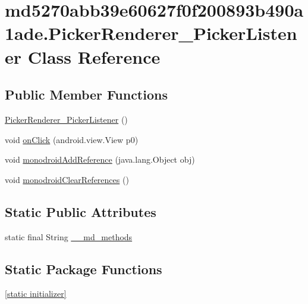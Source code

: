 \hypertarget{classmd5270abb39e60627f0f200893b490a1ade_1_1_picker_renderer___picker_listener}{
\section{md5270abb39e60627f0f200893b490a1ade.PickerRenderer\_\-PickerListener Class Reference}
\label{classmd5270abb39e60627f0f200893b490a1ade_1_1_picker_renderer___picker_listener}
}
\subsection*{Public Member Functions}
\begin{CompactItemize}
\item 
\hyperlink{classmd5270abb39e60627f0f200893b490a1ade_1_1_picker_renderer___picker_listener_ef8c4524350f9ce4bd6e7b6e89fad1b3}{PickerRenderer\_\-PickerListener} ()
\item 
void \hyperlink{classmd5270abb39e60627f0f200893b490a1ade_1_1_picker_renderer___picker_listener_1a8816a4e33f89323152ddf1198f9650}{onClick} (android.view.View p0)
\item 
void \hyperlink{classmd5270abb39e60627f0f200893b490a1ade_1_1_picker_renderer___picker_listener_b0a8d648c8fcadf63fe47a153231ea10}{monodroidAddReference} (java.lang.Object obj)
\item 
void \hyperlink{classmd5270abb39e60627f0f200893b490a1ade_1_1_picker_renderer___picker_listener_559d127bb4a4b85e43b4ab8970679f09}{monodroidClearReferences} ()
\end{CompactItemize}
\subsection*{Static Public Attributes}
\begin{CompactItemize}
\item 
static final String \hyperlink{classmd5270abb39e60627f0f200893b490a1ade_1_1_picker_renderer___picker_listener_0364241ced938474af94b5858f99e10d}{\_\-\_\-md\_\-methods}
\end{CompactItemize}
\subsection*{Static Package Functions}
\begin{CompactItemize}
\item 
\hyperlink{classmd5270abb39e60627f0f200893b490a1ade_1_1_picker_renderer___picker_listener_60cb8802269529548a00aa3d5b6e0f6d}{\mbox{[}static initializer\mbox{]}}
\end{CompactItemize}
